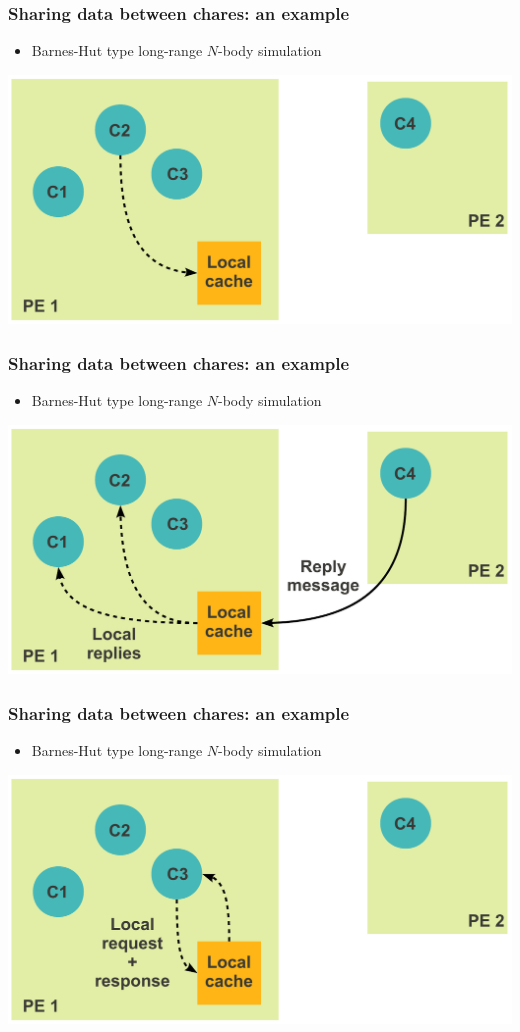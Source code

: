 \begin{frame}[fragile]
  \frametitle{Sharing data between chares: an example}
  \begin{itemize}
    \item Barnes-Hut type long-range $N$-body simulation
  \end{itemize}
  \includegraphics[width=\textwidth]{figures/advancedOpts/fig6}
\end{frame}

\begin{frame}[fragile]
  \frametitle{Sharing data between chares: an example}
  \begin{itemize}
    \item Barnes-Hut type long-range $N$-body simulation
  \end{itemize}
  \includegraphics[width=\textwidth]{figures/advancedOpts/fig7}
\end{frame}

\begin{frame}[fragile]
  \frametitle{Sharing data between chares: an example}
  \begin{itemize}
    \item Barnes-Hut type long-range $N$-body simulation
  \end{itemize}
  \includegraphics[width=\textwidth]{figures/advancedOpts/fig8}
\end{frame}

